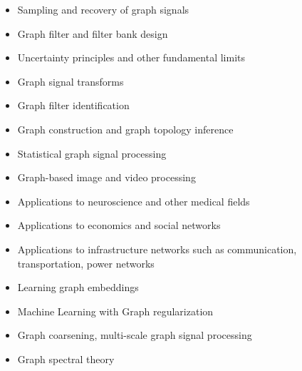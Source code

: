 \documentclass[a4paper]{scrartcl}
\begin{document}
\begin{itemize}
	\setlength{\itemsep}{0pt} \setlength{\parskip}{0pt}
	\item Sampling and recovery of graph signals \cite{puy2015random,tsitsvero2015signals,anis2014towards}
	\item Graph filter and filter bank design \cite{hammond2011wavelets,narang_bior_filters,ekambaram_globalsip,leonardi_multislice,leonardi_fmri,shuman2013spectrum}
	\item Uncertainty principles and other fundamental limits \cite{perraudin2016global,agaskar_spie,pasdeloup}
	\item Graph signal transforms \cite{szlam,gavish,Maggioni_biorthogonal,coifman_diffusion_2006,lafon_coarse,narang_lifting_graphs}
	\item Graph filter identification \cite{thanou_TSP_2014}
	\item Graph construction and graph topology inference \cite{kalofolias2016learn,Dong:2014tj}
	\item Statistical graph signal processing \cite{perraudin2016stationary,zhang2015graph,gadde2015probabilistic}
	\item Graph-based image and video processing \cite{elmoataz2008nonlocal,lezoray2008nonlocal,shahid2015fast}
	\item Applications to neuroscience and other medical fields \cite{huang2015graph,hu2015spectral}
	\item Applications to economics and social networks
	\item Applications to infrastructure networks such as communication, transportation, power networks \cite{mcgraw,jain2014big,borgnat2011shared}
	\item Learning graph embeddings \cite{von2008consistency,zhou2006learning,belkin2003laplacian}
	\item Machine Learning with Graph regularization \cite{smola,belkin2005towards,zhou2004regularization,zhou2005learning,belkin2006manifold}
	\item Graph coarsening, multi-scale graph signal processing \cite{spielman2011graph,shuman2016multiscale,liu_coarsening,lafon_coarse,jansen}
	\item Graph spectral theory \cite{chung1997spectral,belkin2007convergence,shuman2015vertex,sandryhaila2014discrete,Nakatsukasa2013mysteries,brooks,dekel}
\end{itemize}
\end{document}
